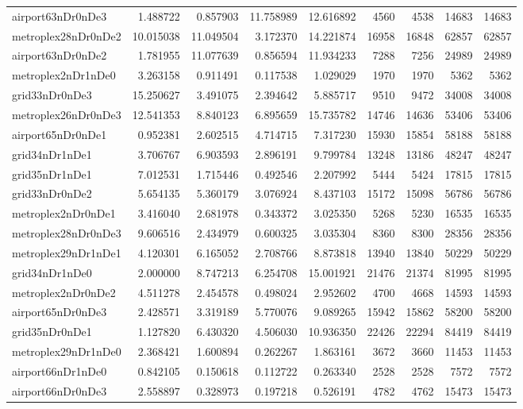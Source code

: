 \begin{longtable}{|l|r|r|r|r|r|r|r|r|}
airport63nDr0nDe3 & 1.488722 & 0.857903 & 11.758989 & 12.616892 & 4560 & 4538 & 14683 & 14683 \\
metroplex28nDr0nDe2 & 10.015038 & 11.049504 & 3.172370 & 14.221874 & 16958 & 16848 & 62857 & 62857 \\
airport63nDr0nDe2 & 1.781955 & 11.077639 & 0.856594 & 11.934233 & 7288 & 7256 & 24989 & 24989 \\
metroplex2nDr1nDe0 & 3.263158 & 0.911491 & 0.117538 & 1.029029 & 1970 & 1970 & 5362 & 5362 \\
grid33nDr0nDe3 & 15.250627 & 3.491075 & 2.394642 & 5.885717 & 9510 & 9472 & 34008 & 34008 \\
metroplex26nDr0nDe3 & 12.541353 & 8.840123 & 6.895659 & 15.735782 & 14746 & 14636 & 53406 & 53406 \\
airport65nDr0nDe1 & 0.952381 & 2.602515 & 4.714715 & 7.317230 & 15930 & 15854 & 58188 & 58188 \\
grid34nDr1nDe1 & 3.706767 & 6.903593 & 2.896191 & 9.799784 & 13248 & 13186 & 48247 & 48247 \\
grid35nDr1nDe1 & 7.012531 & 1.715446 & 0.492546 & 2.207992 & 5444 & 5424 & 17815 & 17815 \\
grid33nDr0nDe2 & 5.654135 & 5.360179 & 3.076924 & 8.437103 & 15172 & 15098 & 56786 & 56786 \\
metroplex2nDr0nDe1 & 3.416040 & 2.681978 & 0.343372 & 3.025350 & 5268 & 5230 & 16535 & 16535 \\
metroplex28nDr0nDe3 & 9.606516 & 2.434979 & 0.600325 & 3.035304 & 8360 & 8300 & 28356 & 28356 \\
metroplex29nDr1nDe1 & 4.120301 & 6.165052 & 2.708766 & 8.873818 & 13940 & 13840 & 50229 & 50229 \\
grid34nDr1nDe0 & 2.000000 & 8.747213 & 6.254708 & 15.001921 & 21476 & 21374 & 81995 & 81995 \\
metroplex2nDr0nDe2 & 4.511278 & 2.454578 & 0.498024 & 2.952602 & 4700 & 4668 & 14593 & 14593 \\
airport65nDr0nDe3 & 2.428571 & 3.319189 & 5.770076 & 9.089265 & 15942 & 15862 & 58200 & 58200 \\
grid35nDr0nDe1 & 1.127820 & 6.430320 & 4.506030 & 10.936350 & 22426 & 22294 & 84419 & 84419 \\
metroplex29nDr1nDe0 & 2.368421 & 1.600894 & 0.262267 & 1.863161 & 3672 & 3660 & 11453 & 11453 \\
airport66nDr1nDe0 & 0.842105 & 0.150618 & 0.112722 & 0.263340 & 2528 & 2528 & 7572 & 7572 \\
airport66nDr0nDe3 & 2.558897 & 0.328973 & 0.197218 & 0.526191 & 4782 & 4762 & 15473 & 15473 \\

\end{longtable}
